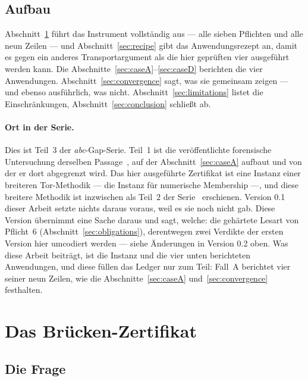 \documentclass[11pt,a4paper]{article}
\theoremstyle{definition}
\begin{document}
\subsection{Aufbau}

Abschnitt~\ref{sec:instrument} führt das Instrument vollständig aus --- alle sieben
Pflichten und alle neun Zeilen --- und Abschnitt~\ref{sec:recipe} gibt das
Anwendungsrezept an, damit es gegen ein anderes Transportargument als die hier
geprüften vier ausgeführt werden kann. Die Abschnitte~\ref{sec:caseA}--\ref{sec:caseD} berichten die vier
Anwendungen. Abschnitt~\ref{sec:convergence} sagt, was sie gemeinsam zeigen --- und
ebenso ausführlich, was nicht. Abschnitt~\ref{sec:limitations} listet die
Einschränkungen, Abschnitt~\ref{sec:conclusion} schließt ab.

\paragraph{Ort in der Serie.} Dies ist Teil~3 der \emph{abc}-Gap-Serie. Teil~1 ist
die veröffentlichte forensische Untersuchung derselben Passage~\cite{GeigerGap2026},
auf der Abschnitt~\ref{sec:caseA} aufbaut und von der er dort abgegrenzt wird. Das
hier ausgeführte Zertifikat ist eine Instanz einer breiteren Tor-Methodik --- die
Instanz für numerische Membership ---, und diese breitere Methodik ist inzwischen
als Teil~2 der Serie~\cite{GeigerBCM2026} erschienen. Version 0.1 dieser Arbeit
setzte nichts daraus voraus, weil es sie noch nicht gab. Diese Version übernimmt
eine Sache daraus und sagt, welche: die gehärtete Lesart von Pflicht~6
(Abschnitt~\ref{sec:obligations}), derentwegen zwei Verdikte der ersten Version
hier umcodiert werden --- siehe \glqq Änderungen in Version 0.2\grqq{} oben.
Was diese Arbeit beiträgt, ist die Instanz und die vier unten berichteten
Anwendungen, und diese füllen das Ledger nur zum Teil: Fall~A berichtet vier
seiner neun Zeilen, wie die Abschnitte~\ref{sec:caseA} und~\ref{sec:convergence}
festhalten.

\section{Das Brücken-Zertifikat}
\label{sec:instrument}

\subsection{Die Frage}
\end{document}
